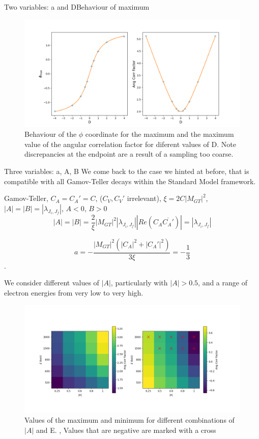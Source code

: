 \documentclass{beamer}
\begin{document}
\begin{frame}{Two variables: a and D}{Behaviour of maximum}
	\begin{figure}
		\centering
		\includegraphics[width=0.8\paperwidth]{plots/aD_max_behaviour}
		\caption{Behaviour of the $\phi$ coordinate for the maximum and the maximum value of the angular correlation factor for diferent values of D. Note discrepancies at the endpoint are a result of a sampling too coarse.}
	\end{figure}
\end{frame}

\begin{frame}{Three variables: a, A, B}
	We come back to the case we hinted at before, that is compatible with all Gamov-Teller decays within the Standard Model framework.
	
	Gamov-Teller, $C_A = C_A' = C$, ($C_V, C_V'$ irrelevant), $\xi=2C|M_{GT}|^2$, $|A| = |B| = |\lambda_{J_i,J_f}|$, $A < 0$, $B > 0$ 
	$$|A| = |B| = \frac{2}{\xi}|M_{GT}|^2|\lambda_{J_i,J_f}||Re(C_A\overline{C_A'})| = |\lambda_{J_i,J_f}|$$
 
	$$a = -\frac{|M_{GT}|^2(|C_A|^2+|C_A'|^2)}{3\xi}=-\frac13$$. 
	
	We consider different values of $|A|$, particularly with $|A| > 0.5$, and a range of electron energies from very low to very high.
	
\end{frame}
\begin{frame}
	\begin{figure}
	\centering
	\includegraphics[width=0.8\paperwidth]{plots/aAB_gt_current_physics}
	\caption{Values of the maximum and minimum for different combinations of $|A|$ and E. , Values that are negative are marked with a cross}
	\end{figure}
\end{frame}
\end{document}
